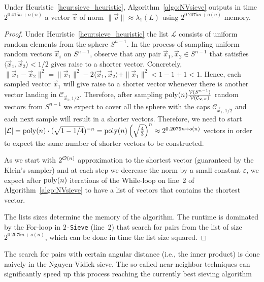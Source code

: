 \begin{theorem} \label{thm:NVsieve}
	Under Heuristic~\ref{heur:sieve_heuristic}, Algorithm~\ref{algo:NVsieve} outputs in time $2^{0.415n + o(n)}$ a vector $\vec v$ of norm $\| \vec v \| \approx \lambda_1(L)$ using $2^{0.2075n + o(n)}$ memory.
\end{theorem}

\begin{proof}
	Under Heuristic~\ref{heur:sieve_heuristic} the list $\mathcal{L}$ consists of uniform random elements from the sphere $S^{n-1}$. In the process of sampling uniform random vectors $\vec x_i$ on $S^{n-1}$, observe that any pair $\vec x_1, \vec x_2 \in S^{n-1}$ that satisfies $\langle \vec x_1, \vec x_2 \rangle <1/2$ gives raise to a shorter vector. Concretely, $\| \vec x_1 - \vec x_2 \|^2 = \| \vec x_1 \|^2 -2\langle \vec x_1, \vec x_2 \rangle +\| \vec x_1 \|^2 < 1 - 1 + 1 < 1$. Hence, each sampled vector $\vec x_1$ will give raise to a shorter vector whenever there is another vector landing in $\mathcal{C}_{\vec x_1, 1/2}$. Therefore, after sampling $\operatorname{poly}(n) \frac {\mathcal{V}(S^{n-1})} {\mathcal{V} (	\mathcal{C}_{\mathbf v, \alpha} ) }$ random vectors from $S^{n-1}$ we expect to cover all the sphere with the caps $\mathcal{C}_{\vec x_1, 1/2}$ and each next sample will result in a shorter vectors. Therefore, we need to start $| \mathcal{L}| = \operatorname{poly}(n) \cdot(\sqrt{1-1/4})^{-n} = \operatorname{poly}(n) \left(\sqrt{\frac{4}{3}}\right)^{n}\approx 2^{0.2075n + o(n)}$ vectors in order to expect the same number of shorter vectors to be constructed.
	
	As we start with $2^{\mathcal{O}(n)}$ approximation to the shortest vector (guaranteed by the Klein's sampler) and at each step we decrease the norm by a small constant $\varepsilon$, we expect after $\operatorname{poly}(n)$ iterations of the While-loop on line~2 of Algorithm~\ref{algo:NVsieve} to have a list of vectors that contains the shortest vector.
	
	The lists sizes determine the memory of the algorithm. The runtime is dominated by the For-loop in 	\texttt{$2$-Sieve} (line~2) that search for pairs from the list of size $2^{0.2075n + o(n)}$, which can be done in time the list size squared.
	
\end{proof}

The search for pairs with certain angular distance (i.e., the inner product) is done naively in the Nguyen-Vidick sieve. The so-called near-neighbor techniques can significantly speed up this process reaching the currently best sieving algorithm~\cite{BDGL16}

